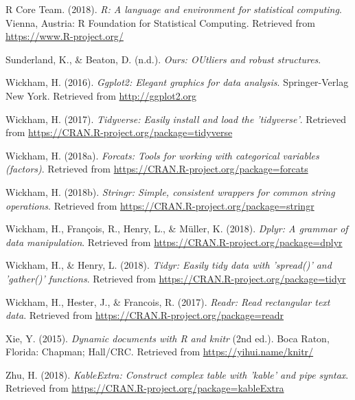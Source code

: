 \documentclass[man,floatsintext]{apa6}
\theoremstyle{definition}
\theoremstyle{definition}
\theoremstyle{definition}
\theoremstyle{remark}
\begin{document}
\leavevmode\hypertarget{ref-R-base}{}%
R Core Team. (2018). \emph{R: A language and environment for statistical
computing}. Vienna, Austria: R Foundation for Statistical Computing.
Retrieved from \url{https://www.R-project.org/}

\leavevmode\hypertarget{ref-R-ours}{}%
Sunderland, K., \& Beaton, D. (n.d.). \emph{Ours: OUtliers and robust
structures}.

\leavevmode\hypertarget{ref-R-ggplot2}{}%
Wickham, H. (2016). \emph{Ggplot2: Elegant graphics for data analysis}.
Springer-Verlag New York. Retrieved from \url{http://ggplot2.org}

\leavevmode\hypertarget{ref-R-tidyverse}{}%
Wickham, H. (2017). \emph{Tidyverse: Easily install and load the
'tidyverse'}. Retrieved from
\url{https://CRAN.R-project.org/package=tidyverse}

\leavevmode\hypertarget{ref-R-forcats}{}%
Wickham, H. (2018a). \emph{Forcats: Tools for working with categorical
variables (factors)}. Retrieved from
\url{https://CRAN.R-project.org/package=forcats}

\leavevmode\hypertarget{ref-R-stringr}{}%
Wickham, H. (2018b). \emph{Stringr: Simple, consistent wrappers for
common string operations}. Retrieved from
\url{https://CRAN.R-project.org/package=stringr}

\leavevmode\hypertarget{ref-R-dplyr}{}%
Wickham, H., François, R., Henry, L., \& Müller, K. (2018). \emph{Dplyr:
A grammar of data manipulation}. Retrieved from
\url{https://CRAN.R-project.org/package=dplyr}

\leavevmode\hypertarget{ref-R-tidyr}{}%
Wickham, H., \& Henry, L. (2018). \emph{Tidyr: Easily tidy data with
'spread()' and 'gather()' functions}. Retrieved from
\url{https://CRAN.R-project.org/package=tidyr}

\leavevmode\hypertarget{ref-R-readr}{}%
Wickham, H., Hester, J., \& Francois, R. (2017). \emph{Readr: Read
rectangular text data}. Retrieved from
\url{https://CRAN.R-project.org/package=readr}

\leavevmode\hypertarget{ref-R-knitr}{}%
Xie, Y. (2015). \emph{Dynamic documents with R and knitr} (2nd ed.).
Boca Raton, Florida: Chapman; Hall/CRC. Retrieved from
\url{https://yihui.name/knitr/}

\leavevmode\hypertarget{ref-R-kableExtra}{}%
Zhu, H. (2018). \emph{KableExtra: Construct complex table with 'kable'
and pipe syntax}. Retrieved from
\url{https://CRAN.R-project.org/package=kableExtra}

\endgroup
\end{document}
